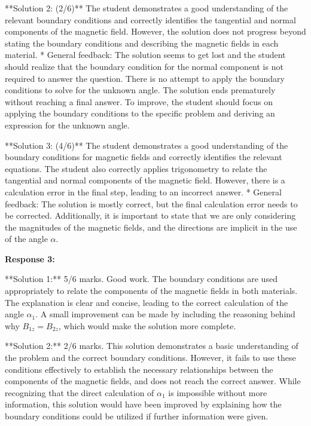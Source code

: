 \documentclass[a4paper,11pt]{article}
\begin{document}
**Solution 2: (2/6)**
The student demonstrates a good understanding of the relevant boundary conditions and correctly identifies the tangential and normal components of the magnetic field. However, the solution does not progress beyond stating the boundary conditions and describing the magnetic fields in each material. 
* General feedback: The solution seems to get lost and the student should realize that the boundary condition for the normal component is not required to answer the question. There is no attempt to apply the boundary conditions to solve for the unknown angle. The solution ends prematurely without reaching a final answer. To improve, the student should focus on applying the boundary conditions to the specific problem and deriving an expression for the unknown angle.

**Solution 3: (4/6)**
The student demonstrates a good understanding of the boundary conditions for magnetic fields and correctly identifies the relevant equations. The student also correctly applies trigonometry to relate the tangential and normal components of the magnetic field. However, there is a calculation error in the final step, leading to an incorrect answer.
* General feedback: The solution is mostly correct, but the final calculation error needs to be corrected. Additionally, it is important to state that we are only considering the magnitudes of the magnetic fields, and the directions are implicit in the use of the angle \( \alpha \).

\bigskip    
\textbf{Response 3:}

**Solution 1:**
5/6 marks.
Good work. The boundary conditions are used appropriately to relate the components of the magnetic fields in both materials. The explanation is clear and concise, leading to the correct calculation of the angle  \(\alpha_{1}\). A small improvement can be made by including the reasoning behind why $B_{1z} = B_{2z}$, which would make the solution more complete.

**Solution 2:**
2/6 marks.
This solution demonstrates a basic understanding of the problem and the correct boundary conditions. However, it fails to use these conditions effectively to establish the necessary relationships between the components of the magnetic fields, and does not reach the correct answer. While recognizing that the direct calculation of $\alpha_{1}$ is impossible without more information, this solution would have been improved by explaining how the boundary conditions could be utilized if further information were given. 
\end{document}
